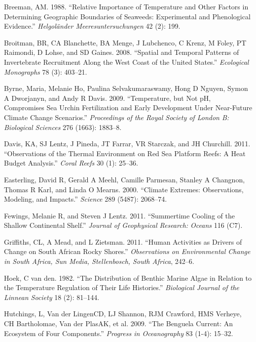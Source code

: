 \documentclass[12pt,a4paper,]{article}
\begin{document}
\leavevmode\hypertarget{ref-Breeman1988}{}%
Breeman, AM. 1988. ``Relative Importance of Temperature and Other
Factors in Determining Geographic Boundaries of Seaweeds: Experimental
and Phenological Evidence.'' \emph{Helgoländer Meeresuntersuchungen} 42
(2): 199.

\leavevmode\hypertarget{ref-Broitman2008}{}%
Broitman, BR, CA Blanchette, BA Menge, J Lubchenco, C Krenz, M Foley, PT
Raimondi, D Lohse, and SD Gaines. 2008. ``Spatial and Temporal Patterns
of Invertebrate Recruitment Along the West Coast of the United States.''
\emph{Ecological Monographs} 78 (3): 403--21.

\leavevmode\hypertarget{ref-Byrne2009}{}%
Byrne, Maria, Melanie Ho, Paulina Selvakumaraswamy, Hong D Nguyen, Symon
A Dworjanyn, and Andy R Davis. 2009. ``Temperature, but Not pH,
Compromises Sea Urchin Fertilization and Early Development Under
Near-Future Climate Change Scenarios.'' \emph{Proceedings of the Royal
Society of London B: Biological Sciences} 276 (1663): 1883--8.

\leavevmode\hypertarget{ref-Davis2011}{}%
Davis, KA, SJ Lentz, J Pineda, JT Farrar, VR Starczak, and JH Churchill.
2011. ``Observations of the Thermal Environment on Red Sea Platform
Reefs: A Heat Budget Analysis.'' \emph{Coral Reefs} 30 (1): 25--36.

\leavevmode\hypertarget{ref-Easterling2000}{}%
Easterling, David R, Gerald A Meehl, Camille Parmesan, Stanley A
Changnon, Thomas R Karl, and Linda O Mearns. 2000. ``Climate Extremes:
Observations, Modeling, and Impacts.'' \emph{Science} 289 (5487):
2068--74.

\leavevmode\hypertarget{ref-Fewings2011}{}%
Fewings, Melanie R, and Steven J Lentz. 2011. ``Summertime Cooling of
the Shallow Continental Shelf.'' \emph{Journal of Geophysical Research:
Oceans} 116 (C7).

\leavevmode\hypertarget{ref-Griffiths2011}{}%
Griffiths, CL, A Mead, and L Zietsman. 2011. ``Human Activities as
Drivers of Change on South African Rocky Shores.'' \emph{Observations on
Environmental Change in South Africa, Sun Media, Stellenbosch, South
Africa}, 242--6.

\leavevmode\hypertarget{ref-Hoek1982}{}%
Hoek, C van den. 1982. ``The Distribution of Benthic Marine Algae in
Relation to the Temperature Regulation of Their Life Histories.''
\emph{Biological Journal of the Linnean Society} 18 (2): 81--144.

\leavevmode\hypertarget{ref-Hutchings2009}{}%
Hutchings, L, Van der LingenCD, LJ Shannon, RJM Crawford, HMS Verheye,
CH Bartholomae, Van der PlasAK, et al. 2009. ``The Benguela Current: An
Ecosystem of Four Components.'' \emph{Progress in Oceanography} 83
(1-4): 15--32.
\end{document}
